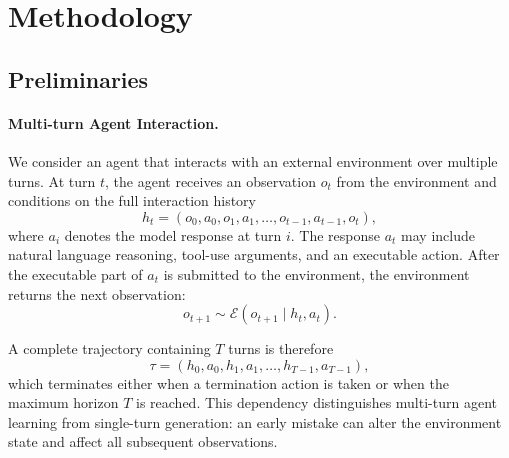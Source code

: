 \section{Methodology}
\label{sec:workflow}
\subsection{Preliminaries}

\paragraph{Multi-turn Agent Interaction.}
We consider an agent that interacts with an external environment over multiple turns.
%
At turn $t$, the agent receives an observation $o_t$ from the environment and conditions on the full interaction history
\begin{equation}
    h_t = (o_0, a_0, o_1, a_1, \ldots, o_{t-1}, a_{t-1}, o_t),
\end{equation}
where $a_i$ denotes the model response at turn $i$. 
%
The response $a_t$ may include natural language reasoning, tool-use arguments, and an executable action. 
%
After the executable part of $a_t$ is submitted to the environment, the environment returns the next observation:
\begin{equation}
    o_{t+1} \sim \mathcal{E}(o_{t+1} \mid h_t, a_t).
\end{equation}

A complete trajectory containing $T$ turns is therefore
\begin{equation}
    \tau = (h_0, a_0, h_1, a_1, \ldots, h_{T-1}, a_{T-1}),
\end{equation}
which terminates either when a termination action is taken or when the maximum horizon $T$ is reached. 
%
This dependency distinguishes multi-turn agent learning from single-turn generation: an early mistake can alter the environment state and affect all subsequent observations.
%


